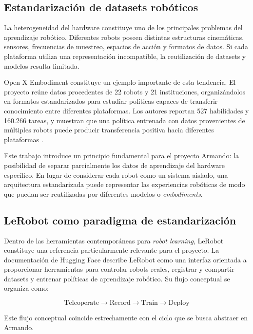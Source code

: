 \documentclass[stu,12pt,floatsintext]{apa7}
\begin{document}
\subsection{Estandarización de datasets robóticos}

La heterogeneidad del hardware constituye uno de los principales problemas del aprendizaje robótico. Diferentes robots poseen distintas estructuras cinemáticas, sensores, frecuencias de muestreo, espacios de acción y formatos de datos. Si cada plataforma utiliza una representación incompatible, la reutilización de datasets y modelos resulta limitada.

Open X-Embodiment constituye un ejemplo importante de esta tendencia. El proyecto reúne datos procedentes de 22 robots y 21 instituciones, organizándolos en formatos estandarizados para estudiar políticas capaces de transferir conocimiento entre diferentes plataformas. Los autores reportan 527 habilidades y 160.266 tareas, y muestran que una política entrenada con datos provenientes de múltiples robots puede producir transferencia positiva hacia diferentes plataformas \parencite{fang2023rh20tcomprehensiveroboticdataset}.

Este trabajo introduce un principio fundamental para el proyecto Armando: la posibilidad de separar parcialmente los datos de aprendizaje del hardware específico. En lugar de considerar cada robot como un sistema aislado, una arquitectura estandarizada puede representar las experiencias robóticas de modo que puedan ser reutilizadas por diferentes modelos o \textit{embodiments}.

\subsection{LeRobot como paradigma de estandarización}

Dentro de las herramientas contemporáneas para \textit{robot learning}, LeRobot constituye una referencia particularmente relevante para el proyecto. La documentación de Hugging Face describe LeRobot como una interfaz orientada a proporcionar herramientas para controlar robots reales, registrar y compartir datasets y entrenar políticas de aprendizaje robótico. Su flujo conceptual se organiza como:

\begin{equation}
\text{Teleoperate}
\rightarrow
\text{Record}
\rightarrow
\text{Train}
\rightarrow
\text{Deploy}
\end{equation}

Este flujo conceptual coincide estrechamente con el ciclo que se busca abstraer en Armando.
\end{document}
